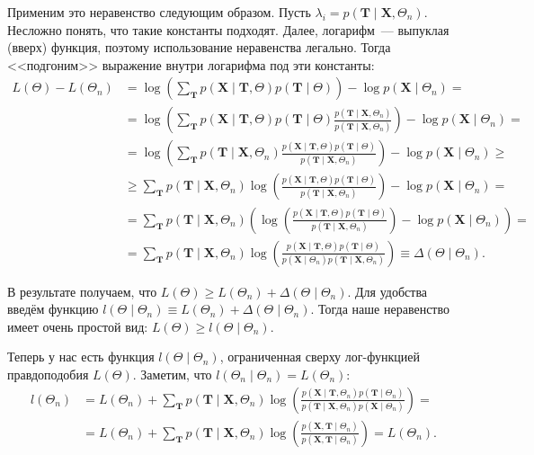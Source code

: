 Применим это неравенство следующим образом. Пусть \(\lambda_{i} = p(\mathbf{T} 
\mid \mathbf{X}, \Theta_{n})\). Несложно понять, что такие константы подходят. 
Далее, логарифм~--- выпуклая (вверх) функция, поэтому использование неравенства 
легально. Тогда <<подгоним>> выражение внутри логарифма под эти константы:
\begin{align*}
	L(\Theta) - L(\Theta_{n}) &= \log\left(\sum_{\mathbf{T}} p(\mathbf{X} \mid 
	\mathbf{T}, \Theta) p(\mathbf{T} \mid \Theta)\right) - \log 
	p(\mathbf{X} \mid \Theta_{n}) = \\
	&= \log\left(\sum_{\mathbf{T}} p(\mathbf{X} \mid 
	\mathbf{T}, \Theta) p(\mathbf{T} \mid \Theta)\frac{p(\mathbf{T} \mid 
	\mathbf{X}, \Theta_{n})}{p(\mathbf{T} \mid \mathbf{X}, \Theta_{n})}\right) 
	- \log p(\mathbf{X} \mid \Theta_{n}) = \\
	&= \log\left(\sum_{\mathbf{T}} p(\mathbf{T} \mid \mathbf{X}, 
	\Theta_{n})\frac{p(\mathbf{X} \mid \mathbf{T}, \Theta) p(\mathbf{T} \mid 
	\Theta)}{p(\mathbf{T} \mid \mathbf{X}, \Theta_{n})}\right) - \log 
	p(\mathbf{X} \mid \Theta_{n}) \geq \\
	&\geq \sum_{\mathbf{T}} p(\mathbf{T} \mid \mathbf{X}, 
	\Theta_{n})\log\left(\frac{p(\mathbf{X} \mid \mathbf{T}, \Theta) 
	p(\mathbf{T} \mid \Theta)}{p(\mathbf{T} \mid \mathbf{X}, 
	\Theta_{n})}\right)  - \log p(\mathbf{X} \mid \Theta_{n}) = \\
	&= \sum_{\mathbf{T}} p(\mathbf{T} \mid \mathbf{X}, 
	\Theta_{n})\left(\log\left(\frac{p(\mathbf{X} \mid \mathbf{T}, \Theta) 
	p(\mathbf{T} \mid \Theta)}{p(\mathbf{T} \mid \mathbf{X}, 
	\Theta_{n})}\right)  - \log p(\mathbf{X} \mid \Theta_{n})\right) = \\
	&= \sum_{\mathbf{T}} p(\mathbf{T} \mid \mathbf{X}, 
	\Theta_{n})\log\left(\frac{p(\mathbf{X} \mid \mathbf{T}, \Theta) 
	p(\mathbf{T} \mid \Theta)}{p(\mathbf{X} \mid \Theta_{n})p(\mathbf{T} \mid 
	\mathbf{X}, \Theta_{n})}\right) \equiv \Delta(\Theta \mid \Theta_{n}).
\end{align*}

В результате получаем, что \(L(\Theta) \geq L(\Theta_{n}) + \Delta(\Theta \mid 
\Theta_{n})\). Для удобства введём функцию \(l(\Theta \mid \Theta_{n}) \equiv 
L(\Theta_{n}) + \Delta(\Theta \mid \Theta_{n})\). Тогда наше неравенство имеет 
очень простой вид: \(L(\Theta) \geq l(\Theta \mid \Theta_{n})\). 

Теперь у нас есть функция \(l(\Theta \mid \Theta_{n})\), ограниченная сверху 
лог-функцией правдоподобия \(L(\Theta)\). Заметим, что \(l(\Theta_{n} \mid 
\Theta_{n}) = L(\Theta_{n})\):
\begin{align*}
	l(\Theta_{n}) &= L(\Theta_{n}) + \sum_{\mathbf{T}} p(\mathbf{T} \mid 
	\mathbf{X}, \Theta_{n})\log\left(\frac{p(\mathbf{X} \mid \mathbf{T}, 
	\Theta_{n}) p(\mathbf{T} \mid \Theta_{n})}{p(\mathbf{T} \mid \mathbf{X}, 
	\Theta_{n})p(\mathbf{X} \mid \Theta_{n})}\right) = \\
	&= L(\Theta_{n}) + \sum_{\mathbf{T}} p(\mathbf{T} \mid 
	\mathbf{X}, \Theta_{n})\log\left(\frac{p(\mathbf{X}, \mathbf{T} \mid 
	\Theta_{n})}{p(\mathbf{X}, \mathbf{T} \mid \Theta_{n})}\right) = 
	L(\Theta_{n}).
\end{align*}

